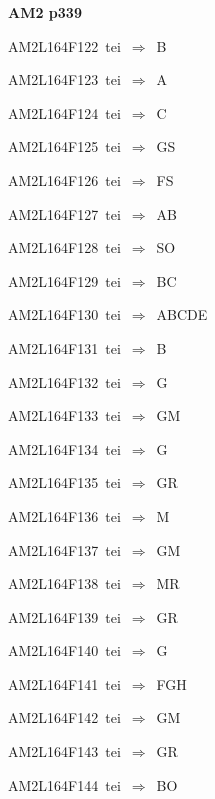 \par\vfill\eject
{\bf\hfill AM2 p339\hfill\hbox{}}\par\bigskip
{\sixrm AM2L164F122\ {\sixit tei}\ }$\Rightarrow$\ B\par\smallskip
{\sixrm AM2L164F123\ {\sixit tei}\ }$\Rightarrow$\ A\par\smallskip
{\sixrm AM2L164F124\ {\sixit tei}\ }$\Rightarrow$\ C\par\smallskip
{\sixrm AM2L164F125\ {\sixit tei}\ }$\Rightarrow$\ GS\par\smallskip
{\sixrm AM2L164F126\ {\sixit tei}\ }$\Rightarrow$\ FS\par\smallskip
{\sixrm AM2L164F127\ {\sixit tei}\ }$\Rightarrow$\ AB\par\smallskip
{\sixrm AM2L164F128\ {\sixit tei}\ }$\Rightarrow$\ SO\par\smallskip
{\sixrm AM2L164F129\ {\sixit tei}\ }$\Rightarrow$\ BC\par\smallskip
{\sixrm AM2L164F130\ {\sixit tei}\ }$\Rightarrow$\ ABCDE\par\smallskip
{\sixrm AM2L164F131\ {\sixit tei}\ }$\Rightarrow$\ B\par\smallskip
{\sixrm AM2L164F132\ {\sixit tei}\ }$\Rightarrow$\ G\par\smallskip
{\sixrm AM2L164F133\ {\sixit tei}\ }$\Rightarrow$\ GM\par\smallskip
{\sixrm AM2L164F134\ {\sixit tei}\ }$\Rightarrow$\ G\par\smallskip
{\sixrm AM2L164F135\ {\sixit tei}\ }$\Rightarrow$\ GR\par\smallskip
{\sixrm AM2L164F136\ {\sixit tei}\ }$\Rightarrow$\ M\par\smallskip
{\sixrm AM2L164F137\ {\sixit tei}\ }$\Rightarrow$\ GM\par\smallskip
{\sixrm AM2L164F138\ {\sixit tei}\ }$\Rightarrow$\ MR\par\smallskip
{\sixrm AM2L164F139\ {\sixit tei}\ }$\Rightarrow$\ GR\par\smallskip
{\sixrm AM2L164F140\ {\sixit tei}\ }$\Rightarrow$\ G\par\smallskip
{\sixrm AM2L164F141\ {\sixit tei}\ }$\Rightarrow$\ FGH\par\smallskip
{\sixrm AM2L164F142\ {\sixit tei}\ }$\Rightarrow$\ GM\par\smallskip
{\sixrm AM2L164F143\ {\sixit tei}\ }$\Rightarrow$\ GR\par\smallskip
{\sixrm AM2L164F144\ {\sixit tei}\ }$\Rightarrow$\ BO\par\smallskip
